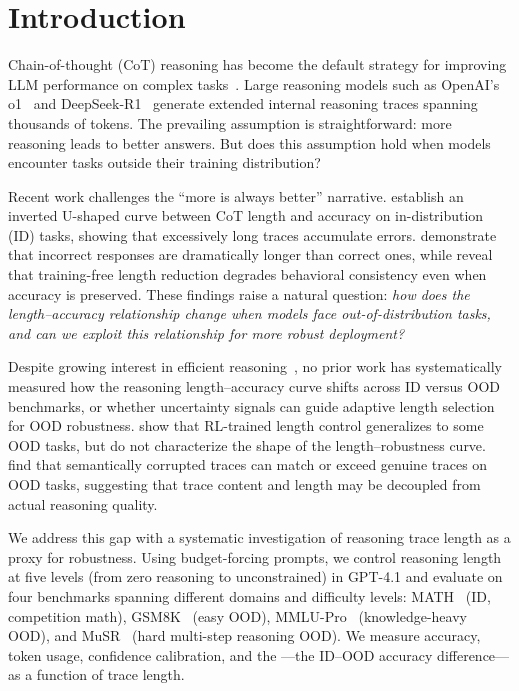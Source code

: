\section{Introduction}
\label{sec:intro}

Chain-of-thought (CoT) reasoning has become the default strategy for improving LLM performance on complex tasks~\citep{wei2022cot}. Large reasoning models such as OpenAI's o1~\citep{openai2024o1} and DeepSeek-R1~\citep{deepseek2025r1} generate extended internal reasoning traces spanning thousands of tokens. The prevailing assumption is straightforward: more reasoning leads to better answers. But does this assumption hold when models encounter tasks outside their training distribution?

Recent work challenges the ``more is always better'' narrative. \citet{wu2025more} establish an inverted U-shaped curve between CoT length and accuracy on in-distribution (ID) tasks, showing that excessively long traces accumulate errors. \citet{su2025underthinking} demonstrate that incorrect responses are dramatically longer than correct ones, while \citet{yang2025longtoshort} reveal that training-free length reduction degrades behavioral consistency even when accuracy is preserved. These findings raise a natural question: \emph{how does the length--accuracy relationship change when models face out-of-distribution tasks, and can we exploit this relationship for more robust deployment?}

Despite growing interest in efficient reasoning~\citep{sui2025overthinking, yue2025efficient}, no prior work has systematically measured how the reasoning length--accuracy curve shifts across ID versus OOD benchmarks, or whether uncertainty signals can guide adaptive length selection for OOD robustness. \citet{aggarwal2025l1} show that RL-trained length control generalizes to some OOD tasks, but do not characterize the shape of the length--robustness curve. \citet{valmeekam2025reasonless} find that semantically corrupted traces can match or exceed genuine traces on OOD tasks, suggesting that trace content and length may be decoupled from actual reasoning quality.

We address this gap with a systematic investigation of reasoning trace length as a proxy for robustness. Using budget-forcing prompts, we control reasoning length at five levels (from zero reasoning to unconstrained) in GPT-4.1 and evaluate on four benchmarks spanning different domains and difficulty levels: MATH~\citep{hendrycks2021math} (ID, competition math), GSM8K~\citep{cobbe2021gsm8k} (easy OOD), MMLU-Pro~\citep{wang2023mmlupro} (knowledge-heavy OOD), and MuSR~\citep{sprague2023musr} (hard multi-step reasoning OOD). We measure accuracy, token usage, confidence calibration, and the \robgap---the ID--OOD accuracy difference---as a function of trace length.

